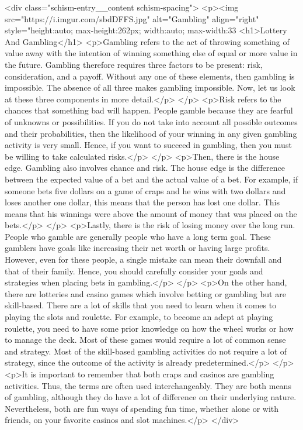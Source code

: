 {		<div class="schism-entry__content schism-spacing">			<p><img src="https://i.imgur.com/sbdDFFS.jpg" alt="Gambling" align="right" style="height:auto; max-height:262px; width:auto; max-width:33%
<h1>Lottery And Gambling</h1>
<p>Gambling refers to the act of throwing something of value away with the intention of winning something else of equal or more value in the future. Gambling therefore requires three factors to be present: risk, consideration, and a payoff. Without any one of these elements, then gambling is impossible. The absence of all three makes gambling impossible. Now, let us look at these three components in more detail.</p>
</p>
<p>Risk refers to the chances that something bad will happen. People gamble because they are fearful of unknowns or possibilities. If you do not take into account all possible outcomes and their probabilities, then the likelihood of your winning in any given gambling activity is very small. Hence, if you want to succeed in gambling, then you must be willing to take calculated risks.</p>
</p>
<p>Then, there is the house edge. Gambling also involves chance and risk. The house edge is the difference between the expected value of a bet and the actual value of a bet. For example, if someone bets five dollars on a game of craps and he wins with two dollars and loses another one dollar, this means that the person has lost one dollar. This means that his winnings were above the amount of money that was placed on the bets.</p>
</p>
<p>Lastly, there is the risk of losing money over the long run. People who gamble are generally people who have a long term goal. These gamblers have goals like increasing their net worth or having large profits. However, even for these people, a single mistake can mean their downfall and that of their family. Hence, you should carefully consider your goals and strategies when placing bets in gambling.</p>
</p>
<p>On the other hand, there are lotteries and casino games which involve betting or gambling but are skill-based. There are a lot of skills that you need to learn when it comes to playing the slots and roulette. For example, to become an adept at playing roulette, you need to have some prior knowledge on how the wheel works or how to manage the deck. Most of these games would require a lot of common sense and strategy. Most of the skill-based gambling activities do not require a lot of strategy, since the outcome of the activity is already predetermined.</p>
</p>
<p>It is important to remember that both craps and casinos are gambling activities. Thus, the terms are often used interchangeably. They are both means of gambling, although they do have a lot of difference on their underlying nature. Nevertheless, both are fun ways of spending fun time, whether alone or with friends, on your favorite casinos and slot machines.</p>
		</div>

}
